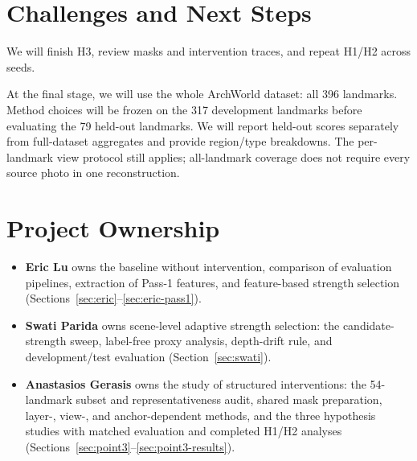 \documentclass[sigconf,nonacm]{acmart}
\begin{document}
\section{Challenges and Next Steps}
We will finish H3, review masks and intervention traces, and repeat H1/H2 across seeds.

At the final stage, we will use the whole ArchWorld dataset: all 396 landmarks. Method choices will be frozen on the 317 development landmarks before evaluating the 79 held-out landmarks. We will report held-out scores separately from full-dataset aggregates and provide region/type breakdowns. The per-landmark view protocol still applies; all-landmark coverage does not require every source photo in one reconstruction.

\newpage
\section{Project Ownership}
\begin{itemize}
\item \textbf{Eric Lu} owns the baseline without intervention, comparison of evaluation pipelines, extraction of Pass-1 features, and feature-based strength selection (Sections~\ref{sec:eric}--\ref{sec:eric-pass1}).
\item \textbf{Swati Parida} owns scene-level adaptive strength selection: the candidate-strength sweep, label-free proxy analysis, depth-drift rule, and development/test evaluation (Section~\ref{sec:swati}).
\item \textbf{Anastasios Gerasis} owns the study of structured interventions: the 54-landmark subset and representativeness audit, shared mask preparation, layer-, view-, and anchor-dependent methods, and the three hypothesis studies with matched evaluation and completed H1/H2 analyses (Sections~\ref{sec:point3}--\ref{sec:point3-results}).
\end{itemize}



\end{document}
